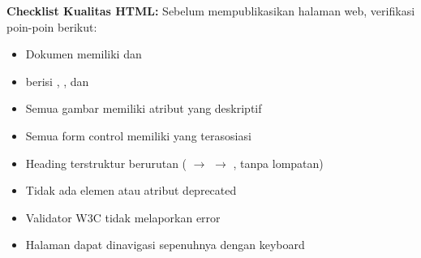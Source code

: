 \begin{konsep}
\textbf{Checklist Kualitas HTML:} Sebelum mempublikasikan halaman web, verifikasi poin-poin berikut:
\begin{itemize}
  \item[$\square$] Dokumen memiliki  dan 
  \item[$\square$]  berisi , , dan 
  \item[$\square$] Semua gambar memiliki atribut  yang deskriptif
  \item[$\square$] Semua form control memiliki  yang terasosiasi
  \item[$\square$] Heading terstruktur berurutan ( $\rightarrow$  $\rightarrow$ , tanpa lompatan)
  \item[$\square$] Tidak ada elemen atau atribut deprecated
  \item[$\square$] Validator W3C tidak melaporkan error
  \item[$\square$] Halaman dapat dinavigasi sepenuhnya dengan keyboard \cite{webdevAccessibility}
\end{itemize}
\end{konsep}

